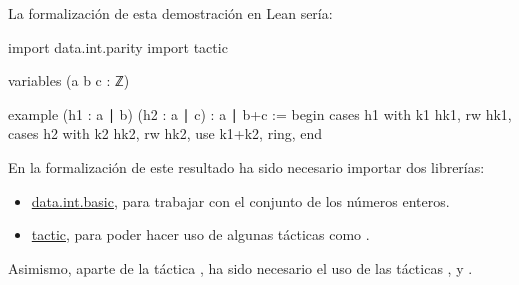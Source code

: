 La formalización de esta demostración en Lean sería:
\begin{leancode}
import data.int.parity
import tactic

variables (a b c : ℤ)

example
  (h1 : a ∣ b)
  (h2 : a ∣ c)
  : a ∣ b+c :=
begin
  cases h1 with k1 hk1,
  rw hk1,
  cases h2 with k2 hk2,
  rw hk2,
  use k1+k2,
  ring,
end
\end{leancode}

En la formalización de este resultado ha sido necesario importar dos librerías:
\begin{itemize}
\item \href{https://github.com/leanprover-community/mathlib/blob/master/src/data/int/basic.lean}{data.int.basic},
  para trabajar con el conjunto de los números enteros.

\item \href{https://github.com/leanprover-community/mathlib/tree/master/src/tactic}{tactic},
  para poder hacer uso de algunas tácticas como .
\end{itemize}

Asimismo, aparte de la táctica , ha sido necesario
el uso de las tácticas
,
 y
.

